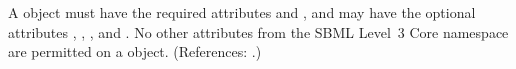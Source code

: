 A \Parameter object must have the required attributes  and
, and may have the optional attributes ,
, ,  and .  No other
attributes from the SBML Level~3 Core namespace are permitted on a
\Parameter object.  (References: .)
